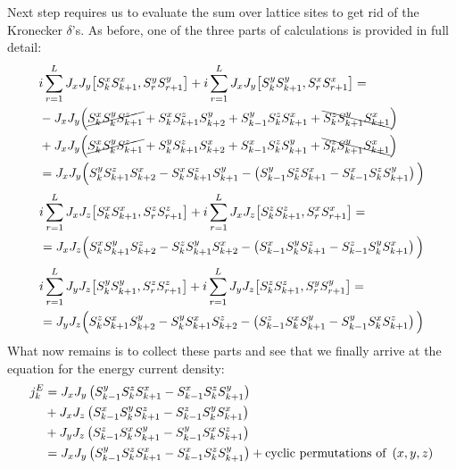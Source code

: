 Next step requires us to evaluate the sum over lattice sites to get rid of the Kronecker \(\delta{}\)'s. As before, one of the three parts of calculations is provided in full detail:
\begin{align*}
    &i\sum_{r=1}^{L}  J_{x} J_{y}\comm{\Sx_{k}\Sx_{k+1}}{\Sy_{r}\Sy_{r+1}} + i\sum_{r=1}^{L} J_{x} J_{y}\comm{\Sy_{k}\Sy_{k+1}}{\Sx_{r}\Sx_{r+1}} = \\
    & - J_x J_y \Big( \cancel{\Sx_k \Sy_k \Sz_{k+1}} +  \Sx_k \Sz_{k+1} \Sy_{k+2} + \Sy_{k-1} \Sz_k \Sx_{k+1} +\bcancel{\Sz_k \Sy_{k+1} \Sx_{k+1}}\Big)\\
    &+  J_x J_y \Big(  \cancel{\Sx_k \Sy_k \Sz_{k+1}} + \Sy_k \Sz_{k+1} \Sx_{k+2} + \Sx_{k-1} \Sz_k \Sy_{k+1} + \bcancel{\Sz_k \Sy_{k+1} \Sx_{k+1}}\Big)\\
    &= J_x J_y \Big( \Sy_k \Sz_{k+1} \Sx_{k+2} - \Sx_k \Sz_{k+1} \Sy_{k+1} - \left(\Sy_{k-1}\Sz_k \Sx_{k+1} - \Sx_{k-1}\Sz_{k}\Sy_{k+1}\right) \Big)
\end{align*}
\begin{align*}
    &i\sum_{r=1}^{L}  J_{x} J_{z}\comm{\Sx_{k}\Sx_{k+1}}{\Sz_{r}\Sz_{r+1}} + i\sum_{r=1}^{L} J_{x} J_{z}\comm{\Sz_{k}\Sz_{k+1}}{\Sx_{r}\Sx_{r+1}} = \\
    &= J_x J_z \Big( \Sx_k \Sy_{k+1} \Sz_{k+2} - \Sz_k \Sy_{k+1} \Sx_{k+2} - \left(\Sx_{k-1}\Sy_k \Sz_{k+1} - \Sz_{k-1}\Sy_{k}\Sx_{k+1}\right) \Big)
\end{align*}
\begin{align*}    
    &i\sum_{r=1}^{L}  J_{y} J_{z}\comm{\Sy_{k}\Sy_{k+1}}{\Sz_{r}\Sz_{r+1}} + i\sum_{r=1}^{L} J_{y} J_{z}\comm{\Sz_{k}\Sz_{k+1}}{\Sy_{r}\Sy_{r+1}} = \\
    &= J_y J_z \Big( \Sz_k \Sx_{k+1} \Sy_{k+2} - \Sy_k \Sx_{k+1} \Sz_{k+2} - \left(\Sz_{k-1}\Sx_k \Sy_{k+1} - \Sy_{k-1}\Sx_{k}\Sz_{k+1}\right) \Big)
\end{align*}
What now remains is to collect these parts and see that we finally arrive at the equation for the energy current density:
\begin{align}
    j_k^E &= J_x J_y \left(S^{y}_{k-1}S^{z}_k S^{x}_{k+1} - S^{x}_{k-1}S^{z}_{k}S^{y}_{k+1}\right) \nonumber \\
    &+ J_x J_z \left(S^{x}_{k-1}S^{y}_k S^{z}_{k+1} - S^{z}_{k-1}S^{y}_{k}S^{x}_{k+1}\right) \nonumber \\
    &+ J_y J_z \left(S^{z}_{k-1}S^{x}_k S^{y}_{k+1} - S^{y}_{k-1}S^{x}_{k}S^{z}_{k+1}\right) \nonumber \\
    &= J_x J_y \left(S^{y}_{k-1}S^{z}_k S^{x}_{k+1} - S^{x}_{k-1}S^{z}_{k}S^{y}_{k+1}\right) + \text{cyclic permutations of } \left(x,y,z\right)
    \label{eq:energy current density}
\end{align}
